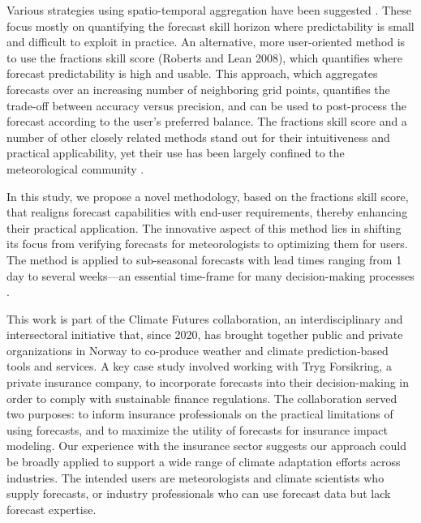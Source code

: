 \documentclass[preprint,12pt,authoryear]{elsarticle}
\begin{document}
Various strategies using spatio-temporal aggregation have been suggested \citep[e.g.,][]{Gong2003,Gilleland2009,JungLeutbecher2008,BuizzLeutbecher2015,Gehne2016,TothBuizza2019,Vanstraaten2020,Young2020,Rivoire2023}. These focus mostly on quantifying the forecast skill horizon where predictability is small and difficult to exploit in practice. An alternative, more user-oriented method is to use the fractions skill score (Roberts and Lean 2008), which quantifies where forecast predictability is high and usable. This approach, which aggregates forecasts over an increasing number of neighboring grid points, quantifies the trade-off between accuracy versus precision, and can be used to post-process the forecast according to the user's preferred balance. The fractions skill score and a number of other closely related methods stand out for their intuitiveness and practical applicability, yet their use has been largely confined to the meteorological community \citep[e.g.,][]{Gilleland2009,jolliffeStephenson2012,Keane2016,ZhaoZhang2018,Schwartz2019,Cafaro2021}.


In this study, we propose a novel methodology, based on the fractions skill score, that realigns forecast capabilities with end-user requirements, thereby enhancing their practical application. The innovative aspect of this method lies in shifting its focus from verifying forecasts for meteorologists to optimizing them for users. The method is applied to sub-seasonal forecasts with lead times ranging from 1 day to several weeks—an essential time-frame for many decision-making processes \citep{Merz2020, White2022}. 


This work is part of the Climate Futures collaboration, an interdisciplinary and intersectoral initiative that, since 2020, has brought together public and private organizations in Norway to co-produce weather and climate prediction-based tools and services. A key case study involved working with Tryg Forsikring, a private insurance company, to incorporate forecasts into their decision-making in order to comply with sustainable finance regulations. The collaboration served two purposes: to inform insurance professionals on the practical limitations of using forecasts, and to maximize the utility of forecasts for insurance impact modeling. Our experience with the insurance sector suggests our approach could be broadly applied to support a wide range of climate adaptation efforts across industries. The intended users are meteorologists and climate scientists who supply forecasts, or industry professionals who can use forecast data but lack forecast expertise. 
\end{document}
